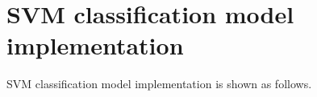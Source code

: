 \chapter{SVM classification model implementation}
SVM classification model implementation is shown as follows.\\


